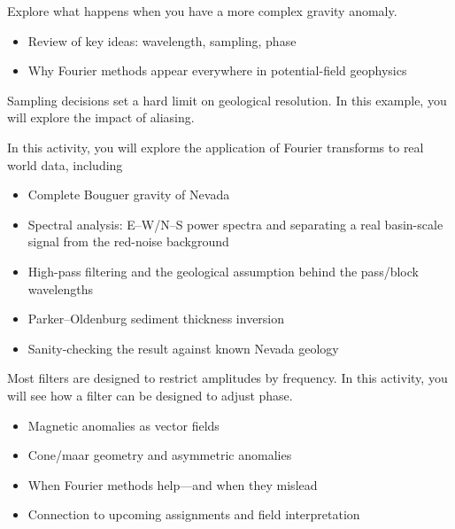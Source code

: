 
Explore what happens when you have a more complex gravity anomaly.

\begin{itemize}
  \item Review of key ideas: wavelength, sampling, phase
  \item Why Fourier methods appear everywhere in potential-field geophysics
\end{itemize}


Sampling decisions set a hard limit on geological resolution.  In this example, you will explore the impact of aliasing.


In this activity, you will explore the application of Fourier transforms to real world data, including
\begin{itemize}
  \item Complete Bouguer gravity of Nevada
  \item Spectral analysis: E--W/N--S power spectra and separating a real basin-scale signal from the red-noise background
  \item High-pass filtering and the geological assumption behind the pass/block wavelengths
  \item Parker--Oldenburg sediment thickness inversion
  \item Sanity-checking the result against known Nevada geology
\end{itemize}


Most filters are designed to restrict amplitudes by frequency.  In this activity, you will see how a filter can be designed to adjust phase.
\begin{itemize}
  \item Magnetic anomalies as vector fields
  \item Cone/maar geometry and asymmetric anomalies
\end{itemize}


\begin{itemize}
  \item When Fourier methods help---and when they mislead
  \item Connection to upcoming assignments and field interpretation
\end{itemize}

